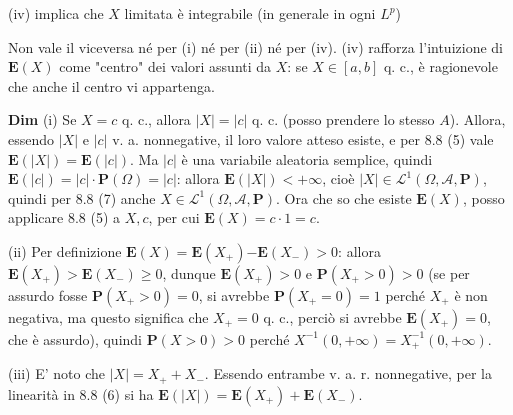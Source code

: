 \documentclass{article}
\begin{document}
(iv) implica che $X$ limitata \`{e} integrabile (in generale in ogni $L^{p}$)

Non
vale il viceversa n\'{e} per (i) n\'{e} per (ii) n\'{e} per (iv). (iv)
rafforza l'intuizione di $\mathbf{E}\left( X\right) $ come "centro" dei
valori assunti da $X$: se $X\in \left[ a,b\right] $ q. c., \`{e} ragionevole
che anche il centro vi appartenga.

\textbf{Dim} (i) Se $X=c$ q. c., allora $\left\vert X\right\vert =\left\vert
c\right\vert $ q. c. (posso prendere lo stesso $A$). Allora, essendo $%
\left\vert X\right\vert $ e $\left\vert c\right\vert $ v. a. nonnegative, il
loro valore atteso esiste, e per 8.8 (5) vale $\mathbf{E}\left( \left\vert
X\right\vert \right) =\mathbf{E}\left( \left\vert c\right\vert \right) $. Ma 
$\left\vert c\right\vert $ \`{e} una variabile aleatoria semplice, quindi $%
\mathbf{E}\left( \left\vert c\right\vert \right) =\left\vert c\right\vert
\cdot \mathbf{P}\left( \Omega \right) =\left\vert c\right\vert $: allora $%
\mathbf{E}\left( \left\vert X\right\vert \right) <+\infty $, cio\`{e} $%
\left\vert X\right\vert \in \mathcal{L}^{1}\left( \Omega ,\mathcal{A},%
\mathbf{P}\right) $, quindi per 8.8 (7) anche $X\in \mathcal{L}^{1}\left(
\Omega ,\mathcal{A},\mathbf{P}\right) $. Ora che so che esiste $\mathbf{E}%
\left( X\right) $, posso applicare 8.8 (5) a $X,c$, per cui $\mathbf{E}%
\left( X\right) =c\cdot 1=c$.

(ii) Per definizione $\mathbf{E}\left( X\right) =\mathbf{E}\left(
X_{+}\right) \mathbf{-E}\left( X_{-}\right) >0$: allora $\mathbf{E}\left(
X_{+}\right) >\mathbf{E}\left( X_{-}\right) \geq 0$, dunque $\mathbf{E}%
\left( X_{+}\right) >0$ e $\mathbf{P}\left( X_{+}>0\right) >0$ (se per
assurdo fosse $\mathbf{P}\left( X_{+}>0\right) =0$, si avrebbe $\mathbf{P}%
\left( X_{+}=0\right) =1$ perch\'{e} $X_{+}$ \`{e} non negativa, ma questo
significa che $X_{+}=0$ q. c., perci\`{o} si avrebbe $\mathbf{E}\left(
X_{+}\right) =0$, che \`{e} assurdo), quindi $\mathbf{P}\left( X>0\right) >0$
perch\'{e} $X^{-1}\left( 0,+\infty \right) =X_{+}^{-1}\left( 0,+\infty
\right) $.

(iii) E' noto che $\left\vert X\right\vert =X_{+}+X_{-}$. Essendo entrambe
v. a. r. nonnegative, per la linearit\`{a} in 8.8 (6) si ha $\mathbf{E}%
\left( \left\vert X\right\vert \right) =\mathbf{E}\left( X_{+}\right) +%
\mathbf{E}\left( X_{-}\right) $.
\end{document}
